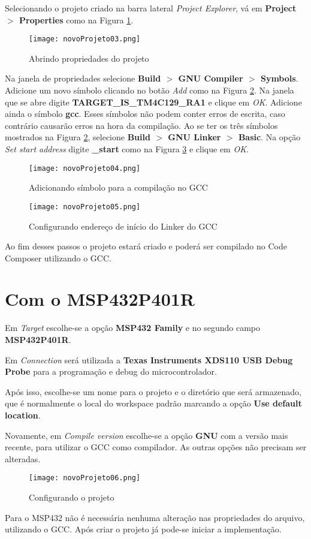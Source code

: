 Selecionando o projeto criado na barra lateral \emph{Project Explorer}, vá em 
\textbf{Project $>$ Properties} como na Figura \ref{fig:novoProjeto03}.

\begin{figure}[H]
	\centering
	\texttt{[image: novoProjeto03.png]}
	\caption{Abrindo propriedades do projeto}
	\label{fig:novoProjeto03}
\end{figure}

Na janela de propriedades selecione \textbf{Build $>$ GNU Compiler $>$ 
Symbols}. Adicione um novo símbolo clicando no botão \emph{Add} como na Figura 
\ref{fig:novoProjeto04}. Na janela que se abre digite 
\textbf{TARGET\_IS\_TM4C129\_RA1} e clique em \emph{OK}. Adicione ainda o 
símbolo \textbf{gcc}. Esses símbolos não podem conter erros de escrita, caso 
contrário causarão erros na hora da compilação. Ao se ter os três símbolos 
mostrados na Figura \ref{fig:novoProjeto04}, selecione \textbf{Build $>$ GNU 
Linker $>$ Basic}. Na opção \emph{Set start address} digite \textbf{\_start} 
como na Figura \ref{fig:novoProjeto05} e clique em \emph{OK}.

\begin{figure}[H]
	\centering
	\texttt{[image: novoProjeto04.png]}
	\caption{Adicionando símbolo para a compilação no GCC}
	\label{fig:novoProjeto04}
\end{figure}

\begin{figure}[H]
	\centering
	\texttt{[image: novoProjeto05.png]}
	\caption{Configurando endereço de início do Linker do GCC}
	\label{fig:novoProjeto05}
\end{figure}

Ao fim desses passos o projeto estará criado e poderá ser compilado no Code Composer utilizando o GCC.

\section{Com o MSP432P401R}

Em \emph{Target} escolhe-se a opção \textbf{MSP432 Family} e no segundo campo \textbf{MSP432P401R}.

Em \emph{Connection} será utilizada a \textbf{Texas Instruments XDS110 USB Debug Probe} para a programação e debug do microcontrolador.

Após isso, escolhe-se um nome para o projeto e o diretório que será armazenado, 
que é normalmente o local do workspace padrão marcando a opção \textbf{Use 
default location}.

Novamente, em \emph{Compile 
version} escolhe-se a opção \textbf{GNU} com a versão mais recente, para utilizar o GCC como compilador.
As outras opções não precisam ser alteradas.

\begin{figure}[H]
	\centering
	\texttt{[image: novoProjeto06.png]}
	\caption{Configurando o projeto}
	\label{fig:novoProjeto06}
\end{figure}

Para o MSP432 não é necessária nenhuma alteração nas propriedades do arquivo, utilizando o GCC. Após criar o projeto já pode-se iniciar a implementação.